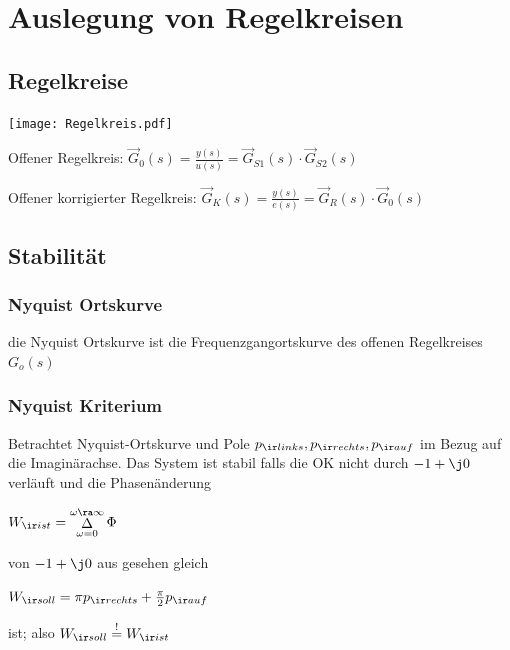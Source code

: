 \documentclass[german]{latex4ei_fs}
\begin{document}
\section{Auslegung von Regelkreisen}
\begin{sectionbox}
\subsection{Regelkreise}
\texttt{[image: Regelkreis.pdf]}


Offener Regelkreis: $\vec G_0 (s) = \frac{y(s)}{u(s)} = \vec G_{S1} (s) \cdot \vec G_{S2} (s)$

Offener korrigierter Regelkreis: $\vec G_K (s) = \frac{y(s)}{e(s)} = \vec G_R (s) \cdot \vec G_0 (s)$
\end{sectionbox}
\begin{sectionbox}
\subsection{Stabilität}

\subsubsection{Nyquist Ortskurve}
	
	die Nyquist Ortskurve ist die Frequenzgangortskurve des offenen Regelkreises $G_o (s)$ 
	
	\subsubsection{Nyquist Kriterium}
	
	Betrachtet Nyquist-Ortskurve und Pole $p_{\ir links}, p_{\ir rechts}, p_{\ir auf}$ im Bezug auf die Imaginärachse.
	Das System ist stabil falls die OK nicht durch $-1 + \j 0$ verläuft und die Phasenänderung \\
	
	\begin{emphbox}
	$W_{\ir ist} = \mathop{\Delta}\limits_{\omega = 0}^{\omega \ra \infty} \Phi$
	\end{emphbox}
	
	von $-1 + \j 0$ aus gesehen gleich \\
	
		\begin{emphbox}
		$W_{\ir soll} = \pi p_{\ir rechts} + \frac{\pi}{2} p_{\ir auf}$
		\end{emphbox}
	ist; also $W_{\ir soll} \stackrel{!}{=} W_{\ir ist}$ 
\end{sectionbox}
\end{document}
